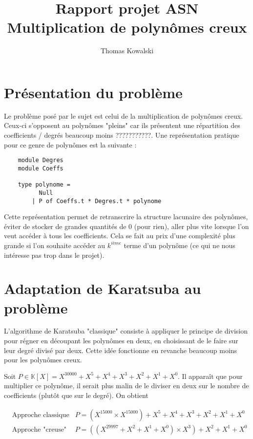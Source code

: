 \documentclass{article}
\title{Rapport projet ASN \\Multiplication de polynômes creux}
\author{Thomas Kowalski}
\begin{document}
\maketitle

\section{Présentation du problème}

Le problème posé par le sujet est celui de la multiplication de polynômes creux. Ceux-ci s'opposent au polynômes "pleins" car ils présentent une répartition des coefficients / degrés beaucoup moins ???????????. Une représentation pratique pour ce genre de polynômes est la suivante :

\begin{lstlisting}
	module Degres 
	module Coeffs

	type polynome = 
		  Null
		| P of Coeffs.t * Degres.t * polynome
\end{lstlisting}

Cette représentation permet de retranscrire la structure lacunaire des polynômes, éviter de stocker de grandes quantités de $0$ (pour rien), aller plus vite lorsque l'on veut accéder à tous les coefficients. Cela se fait au prix d'une complexité plus grande si l'on souhaite accéder au $k^{ième}$ terme d'un polynôme (ce qui ne nous intéresse pas trop dans le projet).

\section{Adaptation de Karatsuba au problème}

L'algorithme de Karatsuba "classique" consiste à appliquer le principe de division pour régner en découpant les polynômes en deux, en choisissant de le faire sur leur degré divisé par deux. Cette idée fonctionne en revanche beaucoup moins pour les polynômes creux. 

Soit $P \in \mathbb{K}[X] = X^{30000} + X^5 + X^4 + X^3 + X^2 + X^1 + X^0$. Il apparaît que pour multiplier ce polynôme, il serait plus malin de le diviser en deux sur le nombre de coefficients (plutôt que sur le degré). On obtient 

\begin{align*}
	& \text{Approche classique :} & P = (X^{15000} \times X^{15000}) + X^5 + X^4 + X^3 + X^2 + X^1 + X^0 \\ 
	& \text{Approche "creuse" :} & P = ((X^{29997} + X^2 + X^1 + X^0) \times X^3) + X^2 + X^1 + X^0 
\end{align*}
\end{document}
